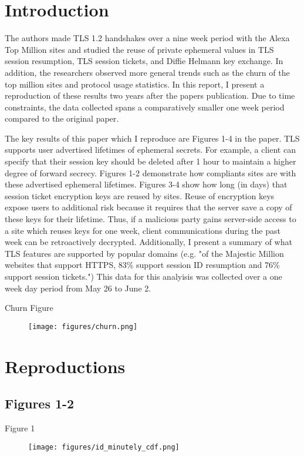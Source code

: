 \section{Introduction}

The authors made TLS 1.2 handshakes over a nine week period with the Alexa Top Million sites and studied the reuse of private ephemeral values in TLS session resumption, TLS session tickets, and Diffie Helmann key exchange. In addition, the researchers observed more general trends such as the churn of the top million sites and protocol usage statistics. In this report, I present a reproduction of these results two years after the papers publication. Due to time constraints, the data collected spans a comparatively smaller one week period compared to the original paper.

The key results of this paper which I reproduce are Figures 1-4 in the paper. TLS supports user advertised lifetimes of ephemeral secrets. For example, a client can specify that their session key should be deleted after 1 hour to maintain a higher degree of forward secrecy. Figures 1-2 demonstrate how compliants sites are with these advertised ephemeral lifetimes. Figures 3-4 show how long (in days) that session ticket encryption keys are reused by sites. Reuse of encryption keys expose users to additional risk because it requires that the server save a copy of these keys for their lifetime. Thus, if a malicious party gains server-side access to a site which reuses keys for one week, client communications during the past week can be retroactively decrypted. Additionally, I present a summary of what TLS features are supported by popular domains (e.g. "of the Majestic Million websites that support HTTPS, 83\% support session ID resumption and 76\% support session tickets.") This data for this analyisis was collected over a one week day period from May 26 to June 2.

Churn Figure
\begin{figure}[tp]
\centering
\texttt{[image: figures/churn.png]}
\caption{\blindtext}
\end{figure}


\section{Reproductions}

\subsection{Figures 1-2}
Figure 1
\begin{figure}[tp]
\centering
\texttt{[image: figures/id\_minutely\_cdf.png]}
\caption{\blindtext}
\end{figure}

